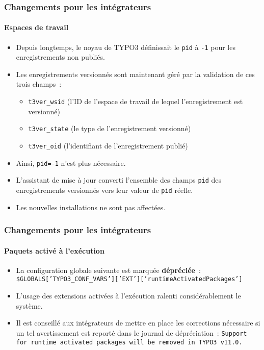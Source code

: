 \begin{frame}[fragile]
	\frametitle{Changements pour les intégrateurs}
	\framesubtitle{Espaces de travail}

	\begin{itemize}
		\item Depuis longtemps, le noyau de TYPO3 définissait le \texttt{pid} à \texttt{-1} pour les enregistrements non publiés.
		\item Les enregistrements versionnés sont maintenant géré par la validation de ces trois champs~:

			\begin{itemize}
				\item \texttt{t3ver\_wsid} (l'ID de l'espace de travail de lequel l'enregistrement est versionné)
				\item \texttt{t3ver\_state} (le type de l'enregistrement versionné)
				\item \texttt{t3ver\_oid} (l'identifiant de l'enregistrement publié)
			\end{itemize}

		\item Ainsi, \texttt{pid=-1} n'est plus nécessaire.
		\item L'assistant de mise à jour converti l'ensemble des champs \texttt{pid} des enregistrements versionnés
			vers leur valeur de \texttt{pid} réelle.
		\item Les nouvelles installations ne sont pas affectées.

	\end{itemize}

\end{frame}


\begin{frame}[fragile]
	\frametitle{Changements pour les intégrateurs}
	\framesubtitle{Paquets activé à l'exécution}

	\begin{itemize}
		\item La configuration globale suivante est marquée \textbf{dépréciée}~:\newline
			\smaller
				\texttt{\$GLOBALS['TYPO3\_CONF\_VARS']['EXT']['runtimeActivatedPackages']}
			\normalsize
		\item L'usage des extensions activées à l'exécution ralenti considérablement le système.
		\item Il est conseillé aux intégrateurs de mettre en place les corrections nécessaire si un tel avertissement
			est reporté dans le journal de dépréciation~:\newline
			\begingroup
				\fontsize{8}{10}
				\texttt{Support for runtime activated packages will be removed in TYPO3 v11.0.}
			\endgroup

	\end{itemize}

\end{frame}

